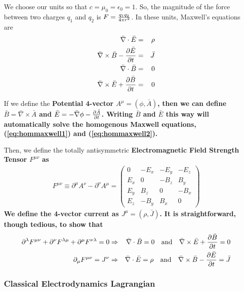 \documentclass[12pt,epsf]{article}
\def\nolabel{\nonumber }
\def\nolabel{\nonumber }
\begin{document}
We choose our units so that $c=\mu_0=\epsilon_0=1$.  So, the magnitude
of the force between two charges $q_1$ and $q_2$ is $F={q_1q_2 \over
4\pi r^2}$.  In these units, Maxwell's equations are 
\begin{eqnarray}
\bar \nabla \cdot \bar E &=& \rho \label{eq:maxwell1} \\
\bar \nabla \times \bar B - {\partial \bar E \over \partial t} &=& \bar
J \label{eq:maxwell2} \\
\bar \nabla \cdot \bar B &=& 0 \label{eq:hommaxwell1} \\
\bar \nabla \times \bar E + {\partial \bar B \over \partial t} &=& 0
\label{eq:hommaxwell2}
\end{eqnarray}

If we define the \bf Potential \rm 4-vector $A^{\mu} = (\phi, \bar
A)$, then we can define $\bar B = \bar \nabla \times \bar A$ and $\bar
E = -\bar \nabla \phi - {\partial \bar A \over \partial t}$.  Writing
$\bar B$ and $\bar E$ this way will automatically solve the homogenous
Maxwell equations, (\ref{eq:hommaxwell1}) and (\ref{eq:hommaxwell2}).  

Then, we define the totally antisymmetric \bf Electromagnetic Field
Strength Tensor \rm $F^{\mu \nu}$ as
\begin{eqnarray}
F^{\mu \nu} \equiv \partial^{\mu}A^{\nu} - \partial^{\nu}A^{\mu} = 
\begin{pmatrix}
0 & -E_x & -E_y & -E_z \\
E_x & 0 & -B_z & B_y \\
E_y & B_z & 0 & -B_x \\
E_z & -B_y & B_x & 0
\end{pmatrix} \nolabel
\end{eqnarray}
We define the 4-vector current as $J^{\mu} = (\rho, \bar J)$. 
It is straightforward, though tedious, to show that
\begin{eqnarray}
\partial^{\lambda}F^{\mu \nu} + \partial^{\nu}F^{\lambda \mu} +
\partial^{\mu}F^{\nu \lambda} = 0 &\Rightarrow& \bar \nabla \cdot \bar
B = 0 \quad \mbox{and} \quad \bar \nabla \times \bar E + {\partial \bar B
\over \partial t} = 0 \nolabel \\
\partial_{\mu}F^{\mu \nu} = J^{\nu} &\Rightarrow& \bar \nabla \cdot
\bar E = \rho \quad \mbox{and} \quad \bar \nabla \times \bar B - {\partial
\bar E \over \partial t} = \bar J \nolabel
\end{eqnarray}

\subsubsection{Classical Electrodynamics Lagrangian}
\end{document}
